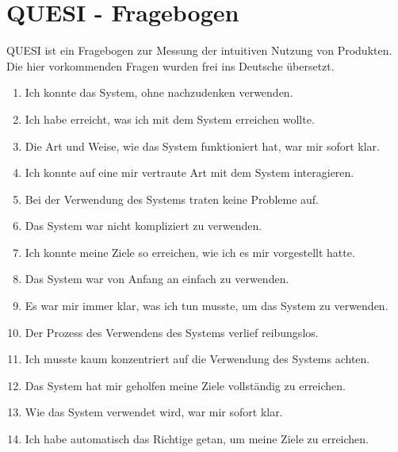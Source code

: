 \section{QUESI - Fragebogen}
\ac{QUESI} ist ein Fragebogen zur Messung der intuitiven Nutzung von Produkten.
Die hier vorkommenden Fragen wurden frei ins Deutsche übersetzt.

\begin{enumerate}
    \item Ich konnte das System, ohne nachzudenken verwenden.
    \item Ich habe erreicht, was ich mit dem System erreichen wollte.
    \item Die Art und Weise, wie das System funktioniert hat, war mir sofort klar.
    \item Ich konnte auf eine mir vertraute Art mit dem System interagieren.
    \item Bei der Verwendung des Systems traten keine Probleme auf.
    \item Das System war nicht kompliziert zu verwenden.
    \item Ich konnte meine Ziele so erreichen, wie ich es mir vorgestellt hatte.
    \item Das System war von Anfang an einfach zu verwenden.
    \item Es war mir immer klar, was ich tun musste, um das System zu verwenden.
    \item Der Prozess des Verwendens des Systems verlief reibungslos.
    \item Ich musste kaum konzentriert auf die Verwendung des Systems achten.
    \item Das System hat mir geholfen meine Ziele vollständig zu erreichen.
    \item Wie das System verwendet wird, war mir sofort klar.
    \item Ich habe automatisch das Richtige getan, um meine Ziele zu erreichen.
\end{enumerate}
